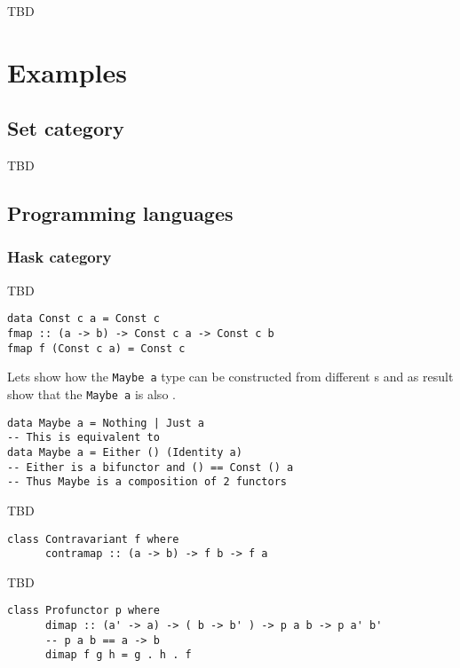 TBD

\section{Examples}

\subsection{\textbf{Set} category}
TBD

\subsection{Programming languages}

\subsubsection{\textbf{Hask} category}
TBD

\begin{example}
\label{ex:terminal_object_cat_hask}
\begin{verbatim}
data Const c a = Const c
fmap :: (a -> b) -> Const c a -> Const c b
fmap f (Const c a) = Const c
\end{verbatim}
\end{example}

\begin{example}
\label{ex:maybe_functor}
Lets show how the \texttt{Maybe a} type can be
constructed from different 
s and as result show that the
\texttt{Maybe a} is also 
. 
\begin{verbatim}
data Maybe a = Nothing | Just a
-- This is equivalent to
data Maybe a = Either () (Identity a)
-- Either is a bifunctor and () == Const () a 
-- Thus Maybe is a composition of 2 functors 
\end{verbatim}
\end{example}

\begin{example}
\label{ex:contravariant_functor_hask}
TBD
\begin{verbatim}
class Contravariant f where
      contramap :: (a -> b) -> f b -> f a
\end{verbatim}
\end{example}

\begin{example}
\label{ex:contravariant_functor_hask}
TBD
\begin{verbatim}
class Profunctor p where
      dimap :: (a' -> a) -> ( b -> b' ) -> p a b -> p a' b'
      -- p a b == a -> b
      dimap f g h = g . h . f
\end{verbatim}
\end{example}


